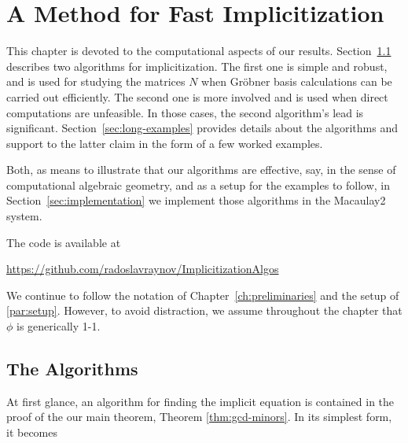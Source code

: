 \documentclass[fleqn,reqno]{amsart}
\begin{document}
\section{A Method for Fast Implicitization}
\label{sec:fast-method}

\begin{paragraf*}
This chapter is devoted to the computational aspects of our results.
Section~\ref{sec:algorithms} describes two algorithms for implicitization.
The first one is simple and robust, and is used for studying the matrices $N$
when Gr\"obner basis calculations can be carried out efficiently.
The second one is more involved and is used when direct computations are unfeasible.
In those cases, the second algorithm's lead is significant.
Section~\ref{sec:long-examples} provides details about the algorithms
and support to the latter claim in the form of a few worked examples.
\end{paragraf*}

\begin{paragraf*}
Both, as means to illustrate that our algorithms are effective, say,
in the sense of computational algebraic geometry,
and as a setup for the examples to follow,
in Section~\ref{sec:implementation} we implement those algorithms in
the Macaulay2 system.
\end{paragraf*}

\begin{paragraf*}
The code is available at
\begin{center}
	\url{https://github.com/radoslavraynov/ImplicitizationAlgos}
\end{center}
\end{paragraf*}

\begin{paragraf*}
We continue to follow the notation of Chapter~\ref{ch:preliminaries}
and the setup of \eqref{par:setup}.
However, to avoid distraction,
we assume throughout the chapter that $\phi$ is generically 1-1.
\end{paragraf*}

\subsection{The Algorithms}
\label{sec:algorithms}

\begin{paragraf*}
At first glance, an algorithm for finding the implicit equation is contained in the proof
of the our main theorem, Theorem \ref{thm:gcd-minors}.
In its simplest form, it becomes
\end{paragraf*}
\end{document}
